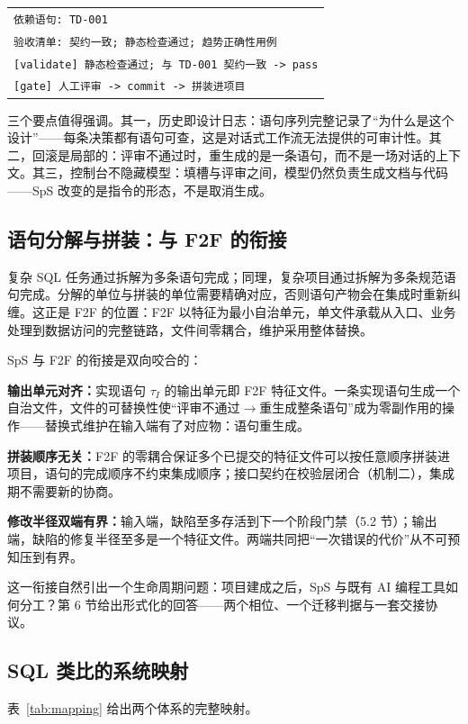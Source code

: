 \documentclass[11pt,a4paper]{ctexart}
\begin{document}
\begin{table}[htbp]
\begin{tabular}{@{}l@{}}
\hspace*{2em}\texttt{依赖语句: TD-001} \\
\hspace*{2em}\texttt{验收清单: 契约一致; 静态检查通过; 趋势正确性用例} \\
\hspace*{2em}\texttt{[validate] 静态检查通过; 与 TD-001 契约一致 -> pass} \\
\hspace*{2em}\texttt{[gate] 人工评审 -> commit -> 拼装进项目} \\
\end{tabular}
\end{table}

三个要点值得强调。其一，历史即设计日志：语句序列完整记录了“为什么是这个设计”——每条决策都有语句可查，这是对话式工作流无法提供的可审计性。其二，回滚是局部的：评审不通过时，重生成的是一条语句，而不是一场对话的上下文。其三，控制台不隐藏模型：填槽与评审之间，模型仍然负责生成文档与代码——SpS 改变的是指令的形态，不是取消生成。

\subsection{语句分解与拼装：与 F2F 的衔接}
复杂 SQL 任务通过拆解为多条语句完成；同理，复杂项目通过拆解为多条规范语句完成。分解的单位与拼装的单位需要精确对应，否则语句产物会在集成时重新纠缠。这正是 F2F\cite{ref20} 的位置：F2F 以特征为最小自治单元，单文件承载从入口、业务处理到数据访问的完整链路，文件间零耦合，维护采用整体替换。

SpS 与 F2F 的衔接是双向咬合的：

\textbf{输出单元对齐：}实现语句 $\tau_I$ 的输出单元即 F2F 特征文件。一条实现语句生成一个自治文件，文件的可替换性使“评审不通过$\rightarrow$重生成整条语句”成为零副作用的操作——替换式维护在输入端有了对应物：语句重生成。

\textbf{拼装顺序无关：}F2F 的零耦合保证多个已提交的特征文件可以按任意顺序拼装进项目，语句的完成顺序不约束集成顺序；接口契约在校验层闭合（机制二），集成期不需要新的协商。

\textbf{修改半径双端有界：}输入端，缺陷至多存活到下一个阶段门禁（5.2 节）；输出端，缺陷的修复半径至多是一个特征文件。两端共同把“一次错误的代价”从不可预知压到有界。

这一衔接自然引出一个生命周期问题：项目建成之后，SpS 与既有 AI 编程工具如何分工？第 6 节给出形式化的回答——两个相位、一个迁移判据与一套交接协议。

\subsection{SQL 类比的系统映射}
表~\ref{tab:mapping} 给出两个体系的完整映射。
\end{document}

